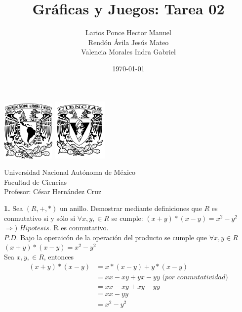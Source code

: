 \documentclass[12pt]{article}
\title{\textbf{Gráficas y Juegos: Tarea 02}}
\author{Larios Ponce Hector Manuel\\Rendón Ávila Jesús Mateo\\Valencia Morales Indra Gabriel }
\date{\today}
\begin{document}
\maketitle
\begin{center}
\vspace{3cm}
\includegraphics[width=0.195\textwidth]{Escudo.png}
\hspace{0.5cm}
\includegraphics[width=0.2\textwidth]{logo_ciencias.png}
\end{center}
\begin{center}
    \vspace{1cm}
    Universidad Nacional Autónoma de México\\
    Facultad de Ciencias\\
    Profesor: César Hernández Cruz\\
\end{center}

\newpage

%
%
\textbf{1.} Sea $(R, +, \ast)$ un anillo. Demostrar mediante definiciones que $R$ es conmutativo si y sólo si
$\forall x, y, \in R$ se cumple: $(x + y) \ast (x - y) = x^2 - y^2$\\

$\Longrightarrow)$ $Hipotesis$. R es conmutativo.\\

$P.D$. Bajo la operaicón de la operación del producto se cumple que $\forall x, y \in R$ $(x + y) \ast (x - y) = x^2 - y^2$\\

Sea $x, y, \in R$, entonces\\

\begin{align*}
    (x + y) \ast (x - y) &= x \ast (x - y) + y \ast (x - y)\\
    &= xx -xy +yx -yy \textit{ (por conmutatividad)}\\
    &= xx -xy +xy -yy\\
    &= xx - yy\\
    &= x^2 -y^2\\
\end{align*} 
\end{document}
